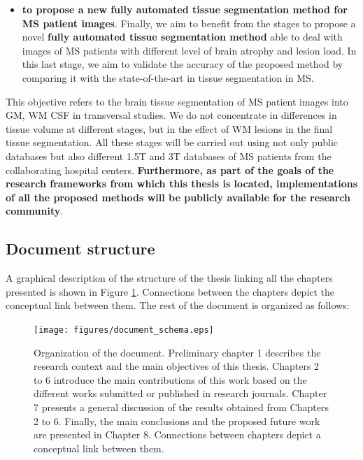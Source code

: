 \begin{itemize}
\item \textbf{to propose a new fully automated tissue segmentation method for MS patient images}. Finally, we aim to benefit from the stages to propose a novel \textbf{fully automated tissue segmentation method} able to deal with images of MS patients with different level of brain atrophy and lesion load. In this last stage, we aim to validate the accuracy of the proposed method by comparing it with the state-of-the-art in tissue segmentation in MS. 

\end{itemize}

\noindent This objective refers to the brain tissue segmentation of MS patient images into GM, WM CSF in transversal studies. We do not concentrate in differences in tissue volume at different stages, but in the effect of WM lesions in the final tissue segmentation. All these stages will be carried out using not only public databases but also different 1.5T and 3T databases of MS patients from the collaborating hospital centers. \textbf{Furthermore, as part of the goals of the research frameworks from which this thesis is located, implementations of all the proposed methods will be publicly available for the research community}.

\subsection{Document structure}
\label{sec:label}

A graphical description of the structure of the thesis linking all the chapters presented is shown in Figure \ref{document_structure}. Connections between the chapters depict the conceptual link between them. The rest of the document is organized as follows:

\begin{figure}[top]
  \begin{center}
    \texttt{[image: figures/document\_schema.eps]}
  \end{center}
    \caption{Organization of the document. Preliminary chapter 1 describes the research context and the main objectives of this thesis. Chapters 2 to 6 introduce the main contributions of this work based on the different works submitted or published in research journals. Chapter 7 presents a general discussion of the results obtained from Chapters 2 to 6. Finally, the main conclusions and the proposed future work are presented in Chapter 8. Connections between chapters depict a conceptual link between them.}
    \label{document_structure}
\end{figure}


